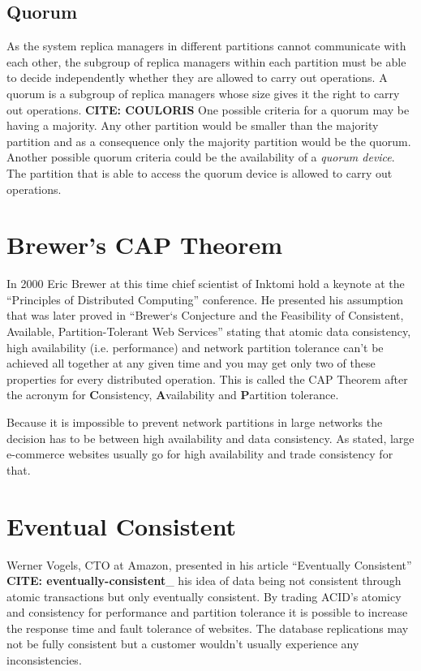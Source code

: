 \documentclass{llncs}
\begin{document}
\subsection{Quorum}

As the system replica managers in different partitions cannot
communicate with each other, the subgroup of replica managers
within each partition must be able to decide independently whether
they are allowed to carry out operations. A quorum is a subgroup of
replica managers whose size gives it the right to carry out
operations. \textbf{CITE: COULORIS} One possible criteria for a
quorum may be having a majority. Any other partition would be
smaller than the majority partition and as a consequence only the
majority partition would be the quorum. Another possible quorum
criteria could be the availability of a \emph{quorum device}. The
partition that is able to access the quorum device is allowed to
carry out operations.

\section{Brewer's CAP Theorem}

In 2000 Eric Brewer at this time chief scientist of Inktomi hold a
keynote at the ``Principles of Distributed Computing'' conference.
He presented his assumption that was later proved in
``Brewer‘s Conjecture and the Feasibility of Consistent, Available, Partition-Tolerant Web Services''
stating that atomic data consistency, high availability (i.e.
performance) and network partition tolerance can't be achieved all
together at any given time and you may get only two of these
properties for every distributed operation. This is called the CAP
Theorem after the acronym for \textbf{C}onsistency,
\textbf{A}vailability and \textbf{P}artition tolerance.

Because it is impossible to prevent network partitions in large
networks the decision has to be between high availability and data
consistency. As stated, large e-commerce websites usually go for
high availability and trade consistency for that.

\section{Eventual Consistent}

Werner Vogels, CTO at Amazon, presented in his article
``Eventually Consistent'' \textbf{CITE: eventually-consistent}\_
his idea of data being not consistent through atomic transactions
but only eventually consistent. By trading ACID's atomicy and
consistency for performance and partition tolerance it is possible
to increase the response time and fault tolerance of websites. The
database replications may not be fully consistent but a customer
wouldn't usually experience any inconsistencies.
\end{document}
